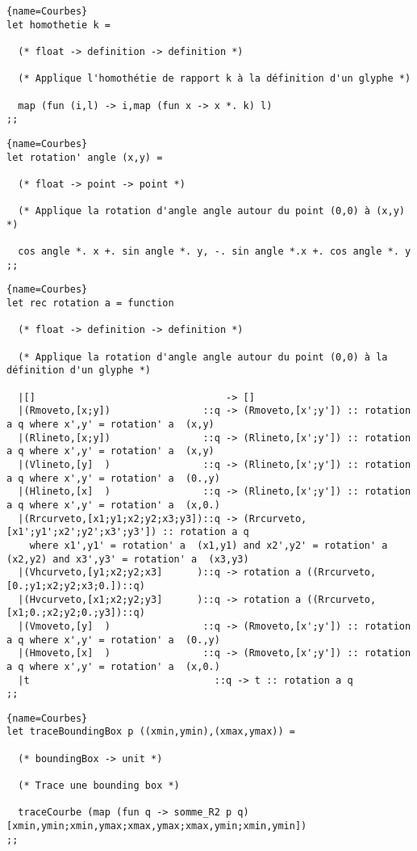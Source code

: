 \documentclass[10pt,twoside,a4paper]{article}
\begin{document}
\begin{lstlisting}{name=Courbes}
let homothetie k =

  (* float -> definition -> definition *)

  (* Applique l'homothétie de rapport k à la définition d'un glyphe *)
  
  map (fun (i,l) -> i,map (fun x -> x *. k) l)
;;
\end{lstlisting}
\pagebreak
\begin{lstlisting}{name=Courbes}
let rotation' angle (x,y) =

  (* float -> point -> point *)

  (* Applique la rotation d'angle angle autour du point (0,0) à (x,y) *)

  cos angle *. x +. sin angle *. y, -. sin angle *.x +. cos angle *. y
;;
\end{lstlisting}
\lstset{frame=single}
\begin{lstlisting}{name=Courbes}
let rec rotation a = function

  (* float -> definition -> definition *)

  (* Applique la rotation d'angle angle autour du point (0,0) à la définition d'un glyphe *)

  |[]                                 -> []
  |(Rmoveto,[x;y])                ::q -> (Rmoveto,[x';y']) :: rotation a q where x',y' = rotation' a  (x,y)
  |(Rlineto,[x;y])                ::q -> (Rlineto,[x';y']) :: rotation a q where x',y' = rotation' a  (x,y)
  |(Vlineto,[y]  )                ::q -> (Rlineto,[x';y']) :: rotation a q where x',y' = rotation' a  (0.,y)
  |(Hlineto,[x]  )                ::q -> (Rlineto,[x';y']) :: rotation a q where x',y' = rotation' a  (x,0.)
  |(Rrcurveto,[x1;y1;x2;y2;x3;y3])::q -> (Rrcurveto,[x1';y1';x2';y2';x3';y3']) :: rotation a q
    where x1',y1' = rotation' a  (x1,y1) and x2',y2' = rotation' a  (x2,y2) and x3',y3' = rotation' a  (x3,y3)
  |(Vhcurveto,[y1;x2;y2;x3]      )::q -> rotation a ((Rrcurveto,[0.;y1;x2;y2;x3;0.])::q)
  |(Hvcurveto,[x1;x2;y2;y3]      )::q -> rotation a ((Rrcurveto,[x1;0.;x2;y2;0.;y3])::q)
  |(Vmoveto,[y]  )                ::q -> (Rmoveto,[x';y']) :: rotation a q where x',y' = rotation' a  (0.,y)
  |(Hmoveto,[x]  )                ::q -> (Rmoveto,[x';y']) :: rotation a q where x',y' = rotation' a  (x,0.)
  |t                                ::q -> t :: rotation a q  
;;
\end{lstlisting}
\lstset{frame=none}
\begin{lstlisting}{name=Courbes}
let traceBoundingBox p ((xmin,ymin),(xmax,ymax)) =

  (* boundingBox -> unit *)

  (* Trace une bounding box *)
  
  traceCourbe (map (fun q -> somme_R2 p q) [xmin,ymin;xmin,ymax;xmax,ymax;xmax,ymin;xmin,ymin])
;;
\end{lstlisting}
\end{document}
